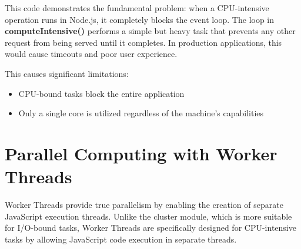 This code demonstrates the fundamental problem: when a CPU-intensive operation runs in Node.js, it completely blocks the event loop. The loop in \textbf{\textcolor{accentColor}{computeIntensive()}} performs a simple but heavy task that prevents any other request from being served until it completes. In production applications, this would cause timeouts and poor user experience.

This causes significant limitations:
\begin{itemize}
    \item CPU-bound tasks block the entire application
    \item Only a single core is utilized regardless of the machine's capabilities
\end{itemize}

\section{Parallel Computing with Worker Threads}

Worker Threads provide true parallelism by enabling the creation of separate JavaScript execution threads. Unlike the cluster module, which is more suitable for I/O-bound tasks, Worker Threads are specifically designed for CPU-intensive tasks by allowing JavaScript code execution in separate threads.

